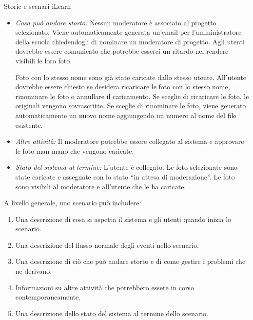 \begin{Example}{Storie e scenari iLearn}{}
\begin{itemize}
    Al termine del caricamento, il sistema invia automaticamente un’email al moderatore del progetto per chiedergli di controllare il nuovo contenuto e genera un messaggio sullo schermo per l’utente, informandolo che il caricamento è stato completato.

    \item \textit{Cosa può andare storto:} Nessun moderatore è associato al progetto selezionato. Viene automaticamente generata un’email per l’amministratore della scuola chiedendogli di nominare un moderatore di progetto. Agli utenti dovrebbe essere comunicato che potrebbe esserci un ritardo nel rendere visibili le loro foto.

    Foto con lo stesso nome sono già state caricate dallo stesso utente. All’utente dovrebbe essere chiesto se desidera ricaricare le foto con lo stesso nome, rinominare le foto o annullare il caricamento. Se sceglie di ricaricare le foto, le originali vengono sovrascritte. Se sceglie di rinominare le foto, viene generato automaticamente un nuovo nome aggiungendo un numero al nome del file esistente.

    \item \textit{Altre attività:} Il moderatore potrebbe essere collegato al sistema e approvare le foto man mano che vengono caricate.

    \item \textit{Stato del sistema al termine:} L’utente è collegato. Le foto selezionate sono state caricate e assegnate con lo stato “in attesa di moderazione”. Le foto sono visibili al moderatore e all’utente che le ha caricate.
\end{itemize}
\end{Example}

A livello generale, uno scenario può includere:
\begin{enumerate}
    \item Una descrizione di cosa si aspetta il sistema e gli utenti quando inizia lo scenario.
    \item Una descrizione del flusso normale degli eventi nello scenario.
    \item Una descrizione di ciò che può andare storto e di come gestire i problemi che ne derivano.
    \item Informazioni su altre attività che potrebbero essere in corso contemporaneamente.
    \item Una descrizione dello stato del sistema al termine dello scenario.
\end{enumerate}

